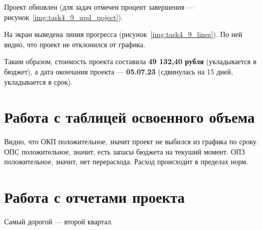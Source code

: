 


Проект обновлен (для задач отмечен процент завершения --- рисунок~\ref{img:task4_9_upd_poject}).

На экран выведена линия прогресса (рисунок~\ref{img:task4_9_lines}). По ней видно, что проект не отклонился от графика.

Таким образом, стоимость проекта составила \textbf{49 132,40 рубля} (укладывается в бюджет), а дата окончания проекта --- \textbf{05.07.23} (сдвинулась на 15 дней, 
укладывается в срок).


\section{Работа с таблицей освоенного объема}



Видно, что ОКП положительное, значит проект не выбился из графика по сроку. ОПС положительное, значит, 
есть запасы бюджета на текуший момент. ОПЗ положительное, значит, нет перерасхода. Расход происходит в пределах норм.

\newpage
\section{Работа с отчетами проекта}


Самый дорогой --- второй квартал.



